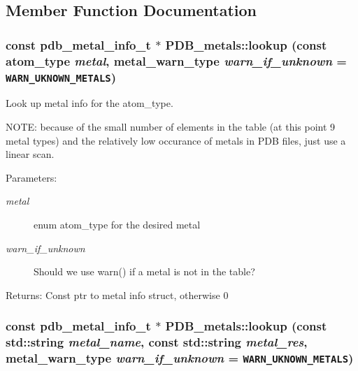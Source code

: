 \subsection{Member Function Documentation}
\subsubsection{\setlength{\rightskip}{0pt plus 5cm}const \bf{pdb\_\-metal\_\-info\_\-t} $\ast$ PDB\_\-metals::lookup (const atom\_\-type {\em metal}, metal\_\-warn\_\-type {\em warn\_\-if\_\-unknown} = {\tt WARN\_\-UKNOWN\_\-METALS})\hspace{0.3cm}{\tt  [static]}}\label{classASCbase_1_1PDB__metals_e7a2d62b17ce424ac6a13cac851638bf}


Look up metal info for the atom\_\-type. 

NOTE: because of the small number of elements in the table (at this point 9 metal types) and the relatively low occurance of metals in PDB files, just use a linear scan.

\begin{Desc}
\item[Parameters:]
\begin{description}
\item[{\em metal}]enum atom\_\-type for the desired metal \item[{\em warn\_\-if\_\-unknown}]Should we use warn() if a metal is not in the table? \end{description}
\end{Desc}
\begin{Desc}
\item[Returns:]Const ptr to metal info struct, otherwise 0 \end{Desc}
\subsubsection{\setlength{\rightskip}{0pt plus 5cm}const \bf{pdb\_\-metal\_\-info\_\-t} $\ast$ PDB\_\-metals::lookup (const std::string {\em metal\_\-name}, const std::string {\em metal\_\-res}, metal\_\-warn\_\-type {\em warn\_\-if\_\-unknown} = {\tt WARN\_\-UKNOWN\_\-METALS})\hspace{0.3cm}{\tt  [static]}}\label{classASCbase_1_1PDB__metals_ee311afb288f71f33ef60d4079bcd407}


